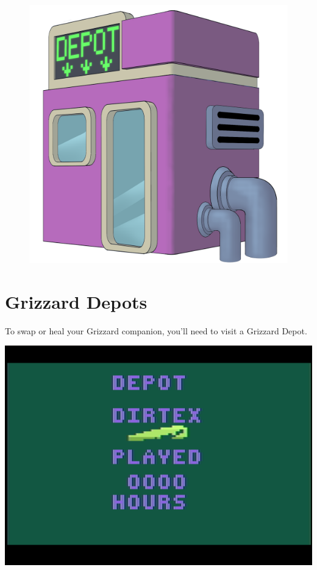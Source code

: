 \documentclass[10pt,twocolumn,openany,article]{memoir}
\begin{document}
\fi \fi

\begin{figure}[t]
  \begin{center}
    \includegraphics[width=2\columnwidth]{../Manual/GrizzardDepot.png}
  \end{center}
\end{figure}

\section{Grizzard Depots}\label{sec:GrizzardDepot}

To  \ifdefined\NOSAVE\else swap  or  \fi heal  your Grizzard  companion,
you'll need to visit a Grizzard Depot.

\begin{center}
  \includegraphics[width=\columnwidth]{../Manual/DepotScreenshotNTSC.png}
\end{center}
\end{document}
